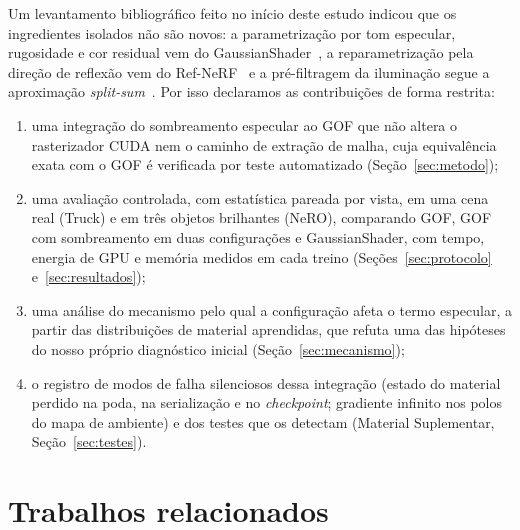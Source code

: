 \documentclass[12pt]{article}
\begin{document}
Um levantamento bibliográfico feito no início deste estudo indicou que os ingredientes isolados não são novos: a parametrização por tom especular, rugosidade e cor residual vem do GaussianShader~\cite{jiang2024gaussianshader}, a reparametrização pela direção de reflexão vem do Ref-NeRF~\cite{verbin2022refnerf} e a pré-filtragem da iluminação segue a aproximação \emph{split-sum}~\cite{karis2013ue4,munkberg2022nvdiffrec}.
Por isso declaramos as contribuições de forma restrita:
\begin{enumerate}
\item uma integração do sombreamento especular ao GOF que não altera o rasterizador CUDA nem o caminho de extração de malha, cuja equivalência exata com o GOF é verificada por teste automatizado (Seção~\ref{sec:metodo});
\item uma avaliação controlada, com estatística pareada por vista, em uma cena real (Truck) e em três objetos brilhantes (NeRO), comparando GOF, GOF com sombreamento em duas configurações e GaussianShader, com tempo, energia de GPU e memória medidos em cada treino (Seções~\ref{sec:protocolo} e~\ref{sec:resultados});
\item uma análise do mecanismo pelo qual a configuração afeta o termo especular, a partir das distribuições de material aprendidas, que refuta uma das hipóteses do nosso próprio diagnóstico inicial (Seção~\ref{sec:mecanismo});
\item o registro de modos de falha silenciosos dessa integração (estado do material perdido na poda, na serialização e no \emph{checkpoint}; gradiente infinito nos polos do mapa de ambiente) e dos testes que os detectam (Material Suplementar, Seção~\ref{sec:testes}).
\end{enumerate}

\section{Trabalhos relacionados}
\label{sec:relacionados}
\end{document}
